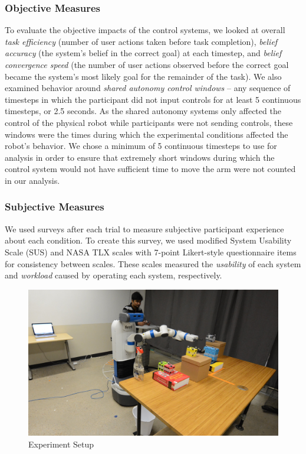 \documentclass[conference]{IEEEtran}
\begin{document}
\subsubsection{Objective Measures}
To evaluate the objective impacts of the control systems, we looked at overall \textit{task efficiency} (number of user actions taken before task completion), \textit{belief accuracy} (the system's belief in the correct goal) at each timestep, and \textit{belief convergence speed} (the number of user actions observed before the correct goal became the system's most likely goal for the remainder of the task). We also examined behavior around \textit{shared autonomy control windows} -- any sequence of timesteps in which the participant did not input controls for at least 5 continuous timesteps, or 2.5 seconds. As the shared autonomy systems only affected the control of the physical robot while participants were not sending controls, these windows were the times during which the experimental conditions affected the robot's behavior. We chose a minimum of 5 continuous timesteps to use for analysis in order to ensure that extremely short windows during which the control system would not have sufficient time to move the arm were not counted in our analysis.

\subsubsection{Subjective Measures}

We used surveys after each trial to measure subjective participant experience about each condition. To create this survey, we used modified System Usability Scale (SUS) and NASA TLX scales with 7-point Likert-style questionnaire items for consistency between scales. These scales measured the \textit{usability} of each system and \textit{workload} caused by operating each system, respectively.


\begin{figure}
\includegraphics[width=\columnwidth]{figures/task_setup-v2.jpg}
\caption{Experiment Setup}
\label{exp_setup}
\end{figure}
\end{document}
